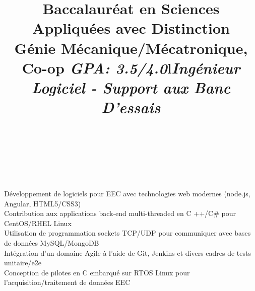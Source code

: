 \documentclass[mm]{res}
\begin{document}
\begin{resume}
\title{Baccalaur\'eat en Sciences Appliqu\'ees avec Distinction\\
G\'enie M\'ecanique/M\'ecatronique, Co-op \textsl{GPA: 3.5/4.0}}
\begin{position}
\end{position}


\toprule

\section{\headingexperience}
\begin{format}
\\
\title{l}\\
\body\\
\end{format}


\title{\textsl{Ing\'enieur Logiciel - Support aux Banc D'essais}}
\begin{position}
\tb D\'eveloppement de logiciels pour EEC avec technologies web modernes (node.js, Angular, HTML5/CSS3)\\
\tb Contribution aux applications back-end multi-threaded en C ++/C\# pour CentOS/RHEL Linux\\
\tb Utilisation de programmation sockets TCP/UDP pour communiquer avec bases de donn\'ees MySQL/MongoDB\\
\tb Int\'egration d'un domaine Agile \`a l'aide de Git, Jenkins et divers cadres de tests unitaire/e2e\\
\tb Conception de pilotes en C embarqu\'e sur RTOS Linux pour l'acquisition/traitement de donn\'ees EEC
\end{position}


\end{resume}
\end{document}
